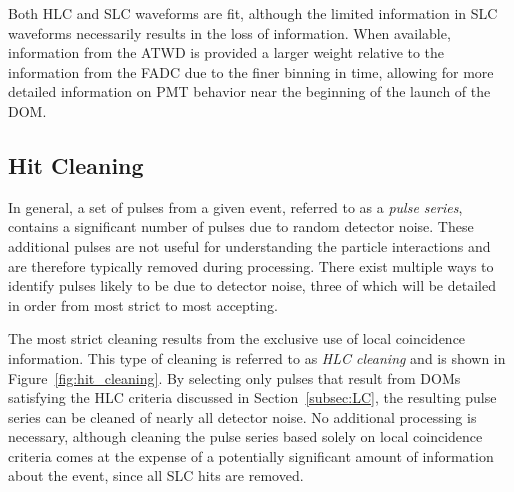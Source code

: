 Both HLC and SLC waveforms are fit, although the limited information in SLC waveforms necessarily results in the loss of information.
When available, information from the ATWD is provided a larger weight relative to the information from the FADC due to the finer binning in time, allowing for more detailed information on PMT behavior near the beginning of the launch of the DOM. 

\subsection{Hit Cleaning}
In general, a set of pulses from a given event, referred to as a \emph{pulse series}, contains a significant number of pulses due to random detector noise.
These additional pulses are not useful for understanding the particle interactions and are therefore typically removed during processing.
There exist multiple ways to identify pulses likely to be due to detector noise, three of which will be detailed in order from most strict to most accepting.

The most strict cleaning results from the exclusive use of local coincidence information.
This type of cleaning is referred to as \emph{HLC cleaning} and is shown in Figure~\ref{fig:hit_cleaning}.
By selecting only pulses that result from DOMs satisfying the HLC criteria discussed in Section~\ref{subsec:LC}, the resulting pulse series can be cleaned of nearly all detector noise.
No additional processing is necessary, although cleaning the pulse series based solely on local coincidence criteria comes at the expense of a potentially significant amount of information about the event, since all SLC hits are removed.


